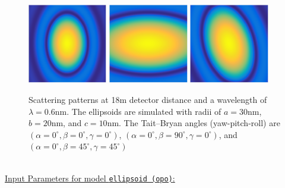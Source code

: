 \begin{figure}[htb]
\includegraphics[width=0.31\textwidth]{../images/form_factor/supershapes/ellipsoid_0_0_0_18m.png} \hfill
\includegraphics[width=0.31\textwidth]{../images/form_factor/supershapes/ellipsoid_0_90_0_18m.png}  \hfill \includegraphics[width=0.31\textwidth]{../images/form_factor/supershapes/ellipsoid_0_45_45_18m.png}
\caption{Scattering patterns at 18m detector distance and a wavelength of $\lambda=0.6$nm. The ellipsoids are simulated with radii of $a=30$nm, $b=20$nm, and $c=10$nm. The Tait–Bryan angles (yaw-pitch-roll) are $(\alpha=0^\circ,\beta=0^\circ,\gamma=0^\circ)$, $(\alpha=0^\circ,\beta=90^\circ,\gamma=0^\circ)$, and $(\alpha=0^\circ,\beta=45^\circ,\gamma=45^\circ)$ }
\label{fig:opo_ellipsoidIQ2D}
\end{figure}
~\\
\underline{Input Parameters for model \texttt{ellipsoid (opo)}:}
